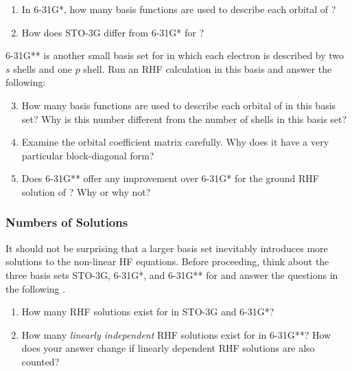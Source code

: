 			\begin{Task}
				\begin{enumerate}[topsep=0pt,itemsep=-1ex,partopsep=1ex,parsep=1ex,label=(\alph*)]
					\item In 6-31G*, how many basis functions are used to describe each orbital of ?
					\item How does STO-3G differ from 6-31G* for ?
				\end{enumerate}
				6-31G** is another small basis set for  in which each electron is described by two $s$ shells and one $p$ shell. Run an RHF calculation in this basis and answer the following:
					\begin{enumerate}[topsep=0pt,itemsep=-1ex,partopsep=1ex,parsep=1ex,label=(\alph*)]
							\setcounter{enumi}{2}
							\item How many basis functions are used to describe each orbital of  in this basis set? Why is this number different from the number of shells in this basis set?
							\item Examine the orbital coefficient matrix carefully. Why does it have a very particular block-diagonal form?
							\item Does 6-31G** offer any improvement over 6-31G* for the ground RHF solution of ? Why or why not?
					\end{enumerate}
			\end{Task}

		
		\subsubsection{Numbers of Solutions}
			\label{subsubsec:numofsols}
		
			It should not be surprising that a larger basis set inevitably introduces more solutions to the non-linear HF equations.
			Before proceeding, think about the three basis sets STO-3G, 6-31G*, and 6-31G** for  and answer the questions in the following \namecref{task:numberofsolsHe}.
			
				\begin{Task}
					\label{task:numberofsolsHe}
					\begin{enumerate}[topsep=0pt,itemsep=-1ex,partopsep=1ex,parsep=1ex,label=(\alph*)]
						\item How many RHF solutions exist for  in STO-3G and 6-31G*?
						\item How many \textit{linearly independent} RHF solutions exist for  in 6-31G**? How does your answer change if linearly dependent RHF solutions are also counted?
					\end{enumerate}
				\end{Task}
			
